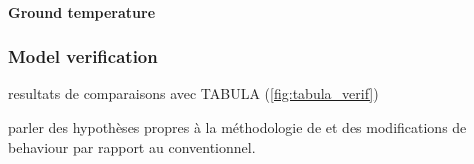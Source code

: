 \documentclass[11pt]{article}
\begin{document}

            \paragraph{Ground temperature} %
            \label{par:ground_temperature}
            
        

        \subsubsection{Model verification} %
        \label{ssub:model_verification}
        
        resultats de comparaisons avec TABULA (\ref{fig:tabula_verif})

        parler des hypothèses propres à la méthodologie de \textcite{pouget_consultants_batiments_2015} et des modifications de behaviour par rapport au conventionnel. 
\end{document}
